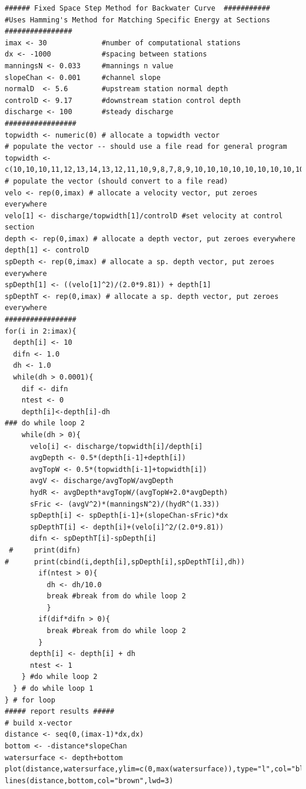 \begin{lstlisting}[caption=R script for Backwater Curve by Fixed Space Method \\ , label=lst:FixedSpaceMethod]
###### Fixed Space Step Method for Backwater Curve  ###########
#Uses Hamming's Method for Matching Specific Energy at Sections
################
imax <- 30             #number of computational stations
dx <- -1000            #spacing between stations
manningsN <- 0.033     #mannings n value
slopeChan <- 0.001     #channel slope
normalD  <- 5.6        #upstream station normal depth
controlD <- 9.17       #downstream station control depth
discharge <- 100       #steady discharge
#################
topwidth <- numeric(0) # allocate a topwidth vector
# populate the vector -- should use a file read for general program
topwidth <- c(10,10,10,11,12,13,14,13,12,11,10,9,8,7,8,9,10,10,10,10,10,10,10,10,10,10,10,10,10,10)
# populate the vector (should convert to a file read)
velo <- rep(0,imax) # allocate a velocity vector, put zeroes everywhere
velo[1] <- discharge/topwidth[1]/controlD #set velocity at control section
depth <- rep(0,imax) # allocate a depth vector, put zeroes everywhere
depth[1] <- controlD
spDepth <- rep(0,imax) # allocate a sp. depth vector, put zeroes everywhere
spDepth[1] <- ((velo[1]^2)/(2.0*9.81)) + depth[1]
spDepthT <- rep(0,imax) # allocate a sp. depth vector, put zeroes everywhere
#################
for(i in 2:imax){
  depth[i] <- 10
  difn <- 1.0
  dh <- 1.0
  while(dh > 0.0001){
    dif <- difn
    ntest <- 0
    depth[i]<-depth[i]-dh
### do while loop 2
    while(dh > 0){
      velo[i] <- discharge/topwidth[i]/depth[i]
      avgDepth <- 0.5*(depth[i-1]+depth[i])
      avgTopW <- 0.5*(topwidth[i-1]+topwidth[i])
      avgV <- discharge/avgTopW/avgDepth
      hydR <- avgDepth*avgTopW/(avgTopW+2.0*avgDepth)
      sFric <- (avgV^2)*(manningsN^2)/(hydR^(1.33))
      spDepth[i] <- spDepth[i-1]+(slopeChan-sFric)*dx
      spDepthT[i] <- depth[i]+(velo[i]^2/(2.0*9.81))
      difn <- spDepthT[i]-spDepth[i]
 #     print(difn)
#      print(cbind(i,depth[i],spDepth[i],spDepthT[i],dh))
        if(ntest > 0){
          dh <- dh/10.0
          break #break from do while loop 2
          }
        if(dif*difn > 0){
          break #break from do while loop 2
        }
      depth[i] <- depth[i] + dh
      ntest <- 1
    } #do while loop 2
  } # do while loop 1
} # for loop
##### report results #####
# build x-vector
distance <- seq(0,(imax-1)*dx,dx)
bottom <- -distance*slopeChan
watersurface <- depth+bottom
plot(distance,watersurface,ylim=c(0,max(watersurface)),type="l",col="blue",lwd=3)
lines(distance,bottom,col="brown",lwd=3)
\end{lstlisting} 

